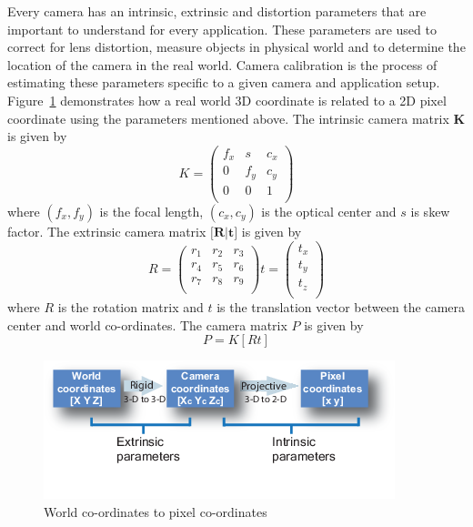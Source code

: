 Every camera has an intrinsic, extrinsic and distortion parameters that are important to understand for every application. These parameters are used to correct for lens distortion, measure objects in physical world and to determine the location of the camera in the real world. Camera calibration is the process of estimating these parameters specific to a given camera and application setup. Figure~\ref{fig:transform} demonstrates how a real world 3D coordinate is related to a 2D pixel coordinate using the parameters mentioned above. The intrinsic camera matrix \textbf{K} is given by
\begin{equation}
K = 
\begin{pmatrix}
  f_x & s & c_x \\
  0 & f_y & c_y \\
  0 & 0 & 1 \\
 \end{pmatrix}
\end{equation}
where $(f_x, f_y)$ is the focal length, $(c_x, c_y)$ is the optical center
and $s$ is skew factor. The extrinsic camera matrix $\textbf{[R|t]}$ is given by
\begin{equation}
R = 
\begin{pmatrix}
  r_1 & r_2 & r_3 \\
  r_4 & r_5 & r_6 \\
  r_7 & r_8 & r_9 \\
 \end{pmatrix}
t = 
\begin{pmatrix}
  t_x \\
  t_y \\
  t_z \\
 \end{pmatrix}
\end{equation}
where $R$ is the rotation matrix and $t$ is the translation vector between the camera center and world co-ordinates. The camera matrix $P$ is given by 
\begin{equation}
P = K[R t]
\end{equation}

\begin{figure}[H]
  \includegraphics[width=\textwidth]{./figures/imageParams.png}
\caption{World co-ordinates to pixel co-ordinates~\cite{camMATLAB}}
\label{fig:transform}       %
\end{figure}

